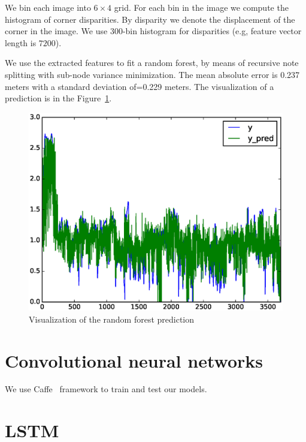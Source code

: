 \documentclass{article}
\begin{document}
We bin each image into $6\times 4$ grid.  For each bin in the image we
compute the histogram of corner disparities.  By disparity we denote
the displacement of the corner in the image.  We use $300$-bin
histogram for disparities (e.g, feature vector length is $7200$).

We use the extracted features to fit a random forest, by means of
recursive note splitting with sub-node variance minimization. The mean
absolute error is 0.237 meters with a standard deviation of=0.229
meters.  The visualization of a prediction is in the
Figure~\ref{fig:rf_fit}.

\begin{figure}[!ht]
  \centering
  \includegraphics[width=1.2\linewidth]{yerr}
  \caption{Visualization of the random forest prediction}
  \label{fig:rf_fit}
\end{figure}

\section{Convolutional neural networks}

We use Caffe~\cite{jia2014caffe} framework to train and test our
models.

\section{LSTM}



\end{document}
